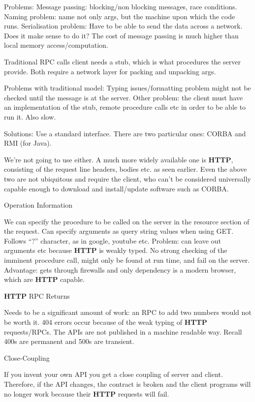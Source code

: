 \documentclass[11pt]{article}
\begin{document}
Problems:
Message passing: blocking/non blocking messages, race conditions.
Naming problem: name not only args, but the machine upon which the code runs.
Serialisation problem: Have to be able to send the data across a network.
Does it make sense to do it? The cost of message passing is much higher than local memory access/computation.

Traditional RPC calls client needs a stub, which is what procedures the server provide. Both require a network layer for packing and unpacking args.

Problems with traditional model:
Typing issues/formatting problem might not be checked until the message is at the server.
Other problem: the client must have an implementation of the stub, remote procedure calls etc in order to be able to run it.
Also slow.

Solutions:
Use a standard interface. There are two particular ones: CORBA and RMI (for Java). 

We’re not going to use either. A much more widely available one is \textbf{HTTP}, consisting of the request line headers, bodies etc. as seen earlier. Even the above two are not ubiquitous and require the client, who can’t be considered universally capable enough to download and install/update software such as CORBA.

Operation Information

We can specify the procedure to be called on the server in the resource section of the request.
Can specify arguments as query string values when using GET. Follows “?” character, as in google, youtube etc. Problem: can leave out arguments etc because \textbf{HTTP} is weakly typed. No strong checking of the imminent procedure call, might only be found at run time, and fail on the server. Advantage: gets through firewalls and only dependency is a modern browser, which are \textbf{HTTP} capable.

\textbf{HTTP} RPC Returns

Needs to be a significant amount of work: an RPC to add two numbers would not be worth it.
404 errors occur because of the weak typing of \textbf{HTTP} requests/RPCs. The APIs are not published in a machine readable way. Recall 400s are permanent and 500s are transient.

Close-Coupling

If you invent your own API you get a close coupling of server and client. Therefore, if the API changes, the contract is broken and the client programs will no longer work because their \textbf{HTTP} requests will fail.
\end{document}
